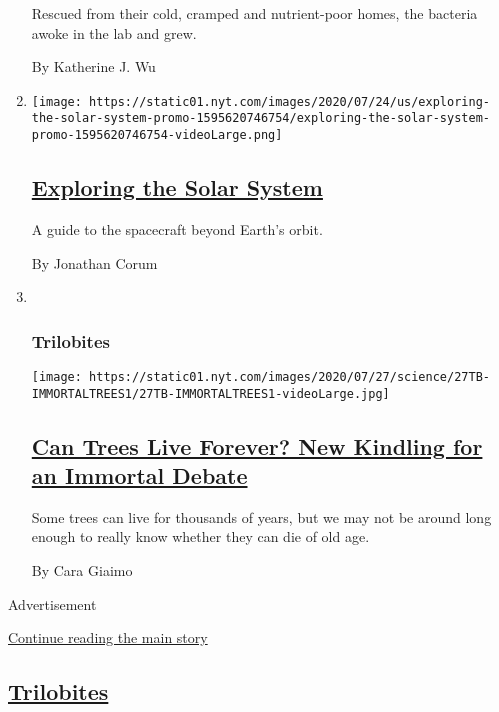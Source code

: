 \begin{enumerate}
  Rescued from their cold, cramped and nutrient-poor homes, the bacteria
  awoke in the lab and grew.

  By Katherine J. Wu
\item
  \texttt{[image: https://static01.nyt.com/images/2020/07/24/us/exploring-the-solar-system-promo-1595620746754/exploring-the-solar-system-promo-1595620746754-videoLarge.png]}

  \hypertarget{exploring-the-solar-system}{%
  \subsection{\texorpdfstring{\href{/interactive/2020/science/exploring-the-solar-system.html}{Exploring
  the Solar
  System}}{Exploring the Solar System}}\label{exploring-the-solar-system}}

  A guide to the spacecraft beyond Earth's orbit.

  By Jonathan Corum
\item ~
  \hypertarget{trilobites-1}{%
  \subsubsection{Trilobites}\label{trilobites-1}}

  \texttt{[image: https://static01.nyt.com/images/2020/07/27/science/27TB-IMMORTALTREES1/27TB-IMMORTALTREES1-videoLarge.jpg]}

  \hypertarget{can-trees-live-forever-new-kindling-for-an-immortal-debate}{%
  \subsection{\texorpdfstring{\href{/2020/07/27/science/trees-immortality.html}{Can
  Trees Live Forever? New Kindling for an Immortal
  Debate}}{Can Trees Live Forever? New Kindling for an Immortal Debate}}\label{can-trees-live-forever-new-kindling-for-an-immortal-debate}}

  Some trees can live for thousands of years, but we may not be around
  long enough to really know whether they can die of old age.

  By Cara Giaimo
\end{enumerate}

Advertisement

\protect\hyperlink{after-mid1}{Continue reading the main story}

\hypertarget{trilobites-2}{%
\subsection{\texorpdfstring{\href{/column/trilobites}{Trilobites}}{Trilobites}}\label{trilobites-2}}


